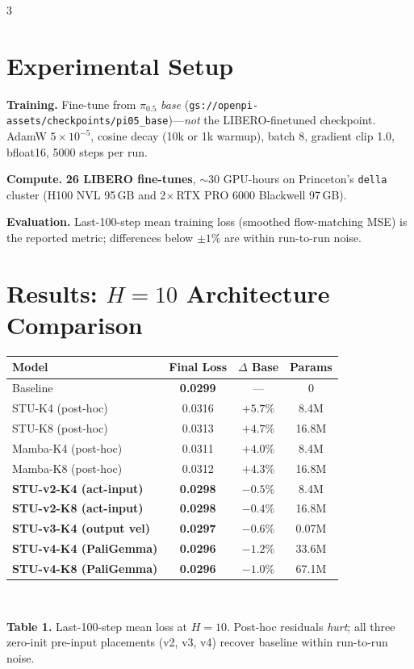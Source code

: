 \documentclass[landscape]{article}
\renewcommand{\footnotesize}{\fontsize{17pt}{21pt}\selectfont}
\begin{document}
\begin{multicols}{3}
\columnbreak

\section*{Experimental Setup}

\textbf{Training.} Fine-tune from $\pi_{0.5}$ \emph{base} (\texttt{gs://openpi-assets/checkpoints/pi05\_base})---\emph{not} the LIBERO-finetuned checkpoint. AdamW $5{\times}10^{-5}$, cosine decay (10k or 1k warmup), batch 8, gradient clip 1.0, bfloat16, 5000 steps per run.

\textbf{Compute.} \textbf{26 LIBERO fine-tunes}, $\sim$30 GPU-hours on Princeton's \texttt{della} cluster (H100 NVL 95\,GB and 2$\times$\,RTX PRO 6000 Blackwell 97\,GB).

\textbf{Evaluation.} Last-100-step mean training loss (smoothed flow-matching MSE) is the reported metric; differences below $\pm 1\%$ are within run-to-run noise.

\section*{Results: $H{=}10$ Architecture Comparison}

\begin{minipage}{\linewidth}
\centering
\footnotesize
\begin{tabular}{@{}lccc@{}}
\toprule
\textbf{Model} & \textbf{Final Loss} & \textbf{$\Delta$ Base} & \textbf{Params} \\
\midrule
Baseline                       & \textbf{0.0299} & ---     & 0 \\
STU-K4 (post-hoc)              & 0.0316 & $+5.7\%$ & 8.4M  \\
STU-K8 (post-hoc)              & 0.0313 & $+4.7\%$ & 16.8M \\
Mamba-K4 (post-hoc)            & 0.0311 & $+4.0\%$ & 8.4M  \\
Mamba-K8 (post-hoc)            & 0.0312 & $+4.3\%$ & 16.8M \\
\midrule
\textbf{STU-v2-K4 (act-input)}    & \textbf{0.0298} & $\mathbf{-0.5\%}$ & 8.4M  \\
\textbf{STU-v2-K8 (act-input)}    & \textbf{0.0298} & $\mathbf{-0.4\%}$ & 16.8M \\
\textbf{STU-v3-K4 (output vel)}   & \textbf{0.0297} & $\mathbf{-0.6\%}$ & 0.07M \\
\textbf{STU-v4-K4 (PaliGemma)}    & \textbf{0.0296} & $\mathbf{-1.2\%}$ & 33.6M \\
\textbf{STU-v4-K8 (PaliGemma)}    & \textbf{0.0296} & $\mathbf{-1.0\%}$ & 67.1M \\
\bottomrule
\end{tabular}
\\[0.4em]
\raggedright
\textbf{Table 1.} Last-100-step mean loss at $H{=}10$. Post-hoc residuals \emph{hurt}; all three zero-init pre-input placements (v2, v3, v4) recover baseline within run-to-run noise.
\end{minipage}


\end{multicols}
\end{document}

